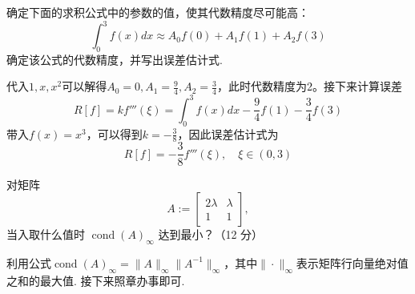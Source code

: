 \begin{exercise}
    确定下面的求积公式中的参数的值，使其代数精度尽可能高：
    \[
        \int_0^3f(x)dx\approx A_0f(0)+A_1f(1)+A_2f(3)
    \]
    确定该公式的代数精度，并写出误差估计式.
\end{exercise}
\begin{solution}
    代入$1,x,x^2$可以解得$A_0=0,A_1=\frac{9}{4},A_2=\frac{3}{4}$，此时代数精度为2。接下来计算误差
    \[
        R[f]=kf'''(\xi)=\int_0^3f(x)dx-\frac{9}{4}f(1)-\frac{3}{4}f(3)
    \]
    带入$f(x)=x^3$，可以得到$k=-\frac{3}{8}$，因此误差估计式为
    \[
        R[f]=-\frac{3}{8}f'''(\xi),\quad \xi\in(0,3)
    \]
\end{solution}

\begin{exercise}
    对矩阵
    $$
        A:=\left[\begin{array}{cc}
                2 \lambda & \lambda \\
                1         & 1
            \end{array}\right],
    $$
    当入取什么值时 $\operatorname{cond}(A)_{\infty}$ 达到最小？（12 分）
\end{exercise}
\begin{solution}
    利用公式$\operatorname{cond}(A)_{\infty}=\|A\|_{\infty}\|A^{-1}\|_{\infty}$，其中$\|\cdot\|_{\infty}$表示矩阵行向量绝对值之和的最大值. 接下来照章办事即可.
\end{solution}

